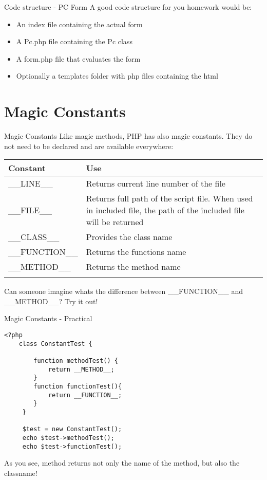 \begin{frame}{Code structure - PC Form}
	A good code structure for you homework would be: \pause
	\begin{itemize}
	\item An index file containing the actual form\pause
	\item A Pc.php file containing the Pc class\pause
	\item A form.php file that evaluates the form\pause
	\item Optionally a templates folder with php files containing the html\pause
	\end{itemize}
\end{frame}

\section{Magic Constants}

\begin{frame}{Magic Constants}
	Like magic methods, PHP has also magic constants. They do not need to be declared and are available everywhere:
	\begin{center}
		\begin{tabular}{m{2.5cm} | m{5cm}}
		Constant & Use \\
		\hline \pause
		\_{}\_{}LINE\_{}\_{} & Returns current line number of the file \\
		\hline \pause
		\_{}\_{}FILE\_{}\_{} & Returns full path of the script file. When used in included file, the path of the included file will be returned\\
		\hline \pause
		\_{}\_{}CLASS\_{}\_{} & Provides the class name\\
		\hline \pause
		\_{}\_{}FUNCTION\_{}\_{} & Returns the functions name \\
		\hline \pause
		\_{}\_{}METHOD\_{}\_{} & Returns the method name\\
		\hline \pause		
		\end{tabular}
	\end{center}
	
	Can someone imagine whats the difference between \_{}\_{}FUNCTION\_{}\_{} and \_{}\_{}METHOD\_{}\_{}? \pause Try it out!
\end{frame}

\begin{frame}[fragile]{Magic Constants - Practical}
	\begin{lstlisting}
<?php
	class ConstantTest {
	    
	    function methodTest() {
	        return __METHOD__;
	    }
	    function functionTest(){
	        return __FUNCTION__;
	    }
	 }
	 
	 $test = new ConstantTest();
	 echo $test->methodTest();
	 echo $test->functionTest();
	\end{lstlisting}
	\pause
	
	As you see, method returns not only the name of the method, but also the classname!
\end{frame}

